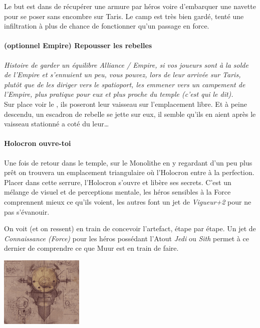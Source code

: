 Le but est dans de récupérer une armure par héros voire d’embarquer une navette pour se poser sans encombre sur Taris. Le camp est très bien gardé, tenté une infiltration à plus de chance de fonctionner qu’un passage en force.

\paragraph{(optionnel Empire) Repousser les rebelles}
\textit{Histoire de garder un équilibre Alliance / Empire, si vos joueurs sont à la solde de l’Empire et s’ennuient un peu, vous pouvez, lors de leur arrivée sur Taris, plutôt que de les diriger vers le spatioport, les emmener vers un campement de l’Empire, plus pratique pour eux et plus proche du temple (c’est  qui le dit).}\\

Sur place voir le , ils poseront leur vaisseau sur l’emplacement libre. Et à peine descendu, un escadron de rebelle se jette sur eux, il semble qu’ils en aient après le vaisseau stationné a coté du leur\ldots

\paragraph{Holocron ouvre-toi}
Une fois de retour dans le temple, sur le Monolithe en y regardant d’un peu plus prêt on trouvera un emplacement triangulaire où l’Holocron entre à la perfection. Placer dans cette serrure, l’Holocron s’ouvre et libère ses secrets. C’est un mélange de visuel et de perceptions mentale, les héros sensibles à la Force comprennent mieux ce qu’ils voient, les autres font un jet de \textit{Vigueur+2} pour ne pas s’évanouir.

On voit (et on ressent)  en train de concevoir l’artefact, étape par étape. Un jet de \textit{Connaissance (Force)} pour les héros possédant l’Atout \textit{Jedi} ou \textit{Sith} permet à ce dernier de comprendre ce que Muur est en train de faire.

\noindent\includegraphics[width=\linewidth]{_img/talisman-book.png}

